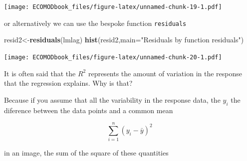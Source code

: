 \documentclass[
]{book}
\newenvironment{Shaded}{\begin{snugshade}}{\end{snugshade}}
\newcommand{\CommentTok}[1]{\textcolor[rgb]{0.56,0.35,0.01}{\textit{#1}}}
\newcommand{\DataTypeTok}[1]{\textcolor[rgb]{0.13,0.29,0.53}{#1}}
\newcommand{\DecValTok}[1]{\textcolor[rgb]{0.00,0.00,0.81}{#1}}
\newcommand{\FloatTok}[1]{\textcolor[rgb]{0.00,0.00,0.81}{#1}}
\newcommand{\KeywordTok}[1]{\textcolor[rgb]{0.13,0.29,0.53}{\textbf{#1}}}
\newcommand{\NormalTok}[1]{#1}
\newcommand{\OperatorTok}[1]{\textcolor[rgb]{0.81,0.36,0.00}{\textbf{#1}}}
\newcommand{\OtherTok}[1]{\textcolor[rgb]{0.56,0.35,0.01}{#1}}
\newcommand{\StringTok}[1]{\textcolor[rgb]{0.31,0.60,0.02}{#1}}
\begin{document}
\begin{Shaded}
\end{Shaded}

\texttt{[image: ECOMODbook\_files/figure-latex/unnamed-chunk-19-1.pdf]}

or alternatively we can use the bespoke function \texttt{residuals}

\begin{Shaded}
\begin{Highlighting}[]
\NormalTok{resid2<-}\KeywordTok{residuals}\NormalTok{(lmlag)}
\KeywordTok{hist}\NormalTok{(resid2,}\DataTypeTok{main=}\StringTok{"Residuals by function residuals"}\NormalTok{)}
\end{Highlighting}
\end{Shaded}

\texttt{[image: ECOMODbook\_files/figure-latex/unnamed-chunk-20-1.pdf]}

It is often said that the \(R^2\) represents the amount of variation in the response that the regression explains. Why is that?

Because if you assume that all the variability in the response data, the \(y_i\) the diference between the data points and a common mean

\[\sum_{i=1}^n (y_i- \bar y)^2\]

in an image, the sum of the square of these quantities

\begin{Shaded}
\end{Shaded}
\end{document}
